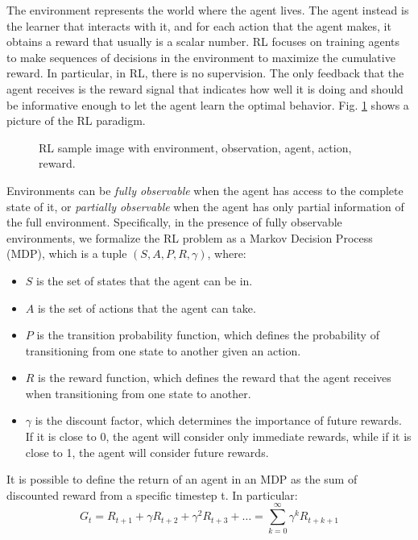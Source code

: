 The environment represents the world where the agent lives.
The agent instead is the learner that interacts with it, and for each action that the agent makes, it obtains a reward that usually is a scalar number.
RL focuses on training agents to make sequences of decisions in the environment to maximize the cumulative reward.
In particular, in RL, there is no supervision.
The only feedback that the agent receives is the reward signal that indicates how well it is doing and should be informative enough to let the agent learn the optimal behavior.
Fig. \ref{fig:rl} shows a picture of the RL paradigm.


\begin{figure}[ht]
    \begin{center}
        \fbox{\rule[-.5cm]{0cm}{4cm} \rule[-.5cm]{4cm}{0cm}}
    \end{center}
    \caption{RL sample image with environment, observation, agent, action, reward.}
    \label{fig:rl}
\end{figure}


Environments can be \textit{fully observable} when the agent has access to the complete state of it, or \textit{partially observable} when the agent has only partial information of the full environment.
Specifically, in the presence of fully observable environments, we formalize the RL problem as a Markov Decision Process (MDP), which is a tuple $(S, A, P, R, \gamma)$, where:
\begin{itemize}
    \item $S$ is the set of states that the agent can be in.
    \item $A$ is the set of actions that the agent can take.
    \item $P$ is the transition probability function, which defines the probability of transitioning from one state to another given an action.
    \item $R$ is the reward function, which defines the reward that the agent receives when transitioning from one state to another.
    \item $\gamma$ is the discount factor, which determines the importance of future rewards.
    If it is close to 0, the agent will consider only immediate rewards, while if it is close to 1, the agent will consider future rewards.
\end{itemize}

It is possible to define the return of an agent in an MDP as the sum of discounted reward from a specific timestep t.
In particular:
\begin{equation} \label{eq:return}
    G_t = R_{t+1} + \gamma R_{t+2} + \gamma^2 R_{t+3} + \dots = \sum_{k=0}^{\infty} \gamma^k R_{t+k+1}
\end{equation}


